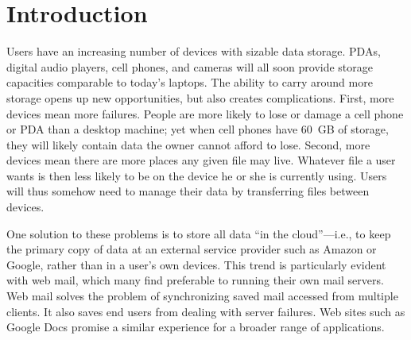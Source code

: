 
\section{Introduction}

%
%

Users have an increasing number of devices with sizable data storage.
PDAs, digital audio players, cell phones, and cameras will all soon
provide storage capacities comparable to today's laptops.  The ability
to carry around more storage opens up new opportunities, but also
creates complications.  First, more devices mean more failures.
People are more likely to lose or damage a cell phone or PDA than a
desktop machine; yet when cell phones have 60~GB of storage, they will
likely contain data the owner cannot afford to lose.  Second, more
devices mean there are more places any given file may live. Whatever
file a user wants is then less likely to be on the device he or she is
currently using.  Users will thus somehow need to manage their data by
transferring files between devices.

One solution to these problems is to store all data ``in the
cloud''---i.e., to keep the primary copy of data at an external
service provider such as Amazon or Google, rather than in a user's own
devices.  This trend is particularly evident with web mail, which many
find preferable to running their own mail servers.  Web mail solves
the problem of synchronizing saved mail accessed from multiple
clients.  It also saves end users from dealing with server failures.
Web sites such as Google Docs promise a similar experience for a
broader range of applications.

